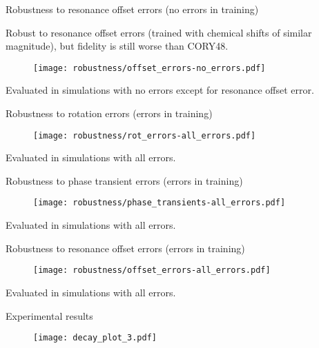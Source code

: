 \documentclass{beamer}
\begin{document}
\begin{frame}{Robustness to resonance offset errors  (no errors in training)}

Robust to resonance offset errors (trained with chemical shifts of similar magnitude), but fidelity is still worse than CORY48.

\begin{figure}
    \centering
    \texttt{[image: robustness/offset\_errors-no\_errors.pdf]}
\end{figure}

Evaluated in simulations with no errors except for resonance offset error.

\end{frame}


\begin{frame}{Robustness to rotation errors (errors in training)}

\begin{figure}
    \centering
    \texttt{[image: robustness/rot\_errors-all\_errors.pdf]}
\end{figure}

Evaluated in simulations with all errors.

\end{frame}

\begin{frame}{Robustness to phase transient errors (errors in training)}

\begin{figure}
    \centering
    \texttt{[image: robustness/phase\_transients-all\_errors.pdf]}
\end{figure}

Evaluated in simulations with all errors.

\end{frame}

\begin{frame}{Robustness to resonance offset errors (errors in training)}

\begin{figure}
    \centering
    \texttt{[image: robustness/offset\_errors-all\_errors.pdf]}
\end{figure}

Evaluated in simulations with all errors.

\end{frame}

\begin{frame}{Experimental results}

\begin{figure}
\centering
\texttt{[image: decay\_plot\_3.pdf]}
\end{figure}

\end{frame}
\end{document}

